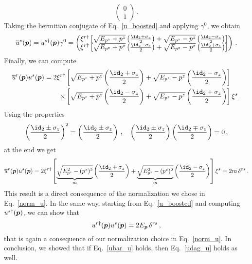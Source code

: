 \begin{sol}
\begin{equation}
\begin{pmatrix}
            0 \\ 1
        \end{pmatrix}\,.
    \end{equation}
    Taking the hermitian conjugate of Eq.~\eqref{u_boosted} and applying $\gamma^0$, we obtain
    \begin{equation}
    \label{ubar_boosted}
        \sbar{u}^{s}(\vp) = u^{s\dagger}(\vp) \gamma^0 =
        \begin{pmatrix}
           \xi^{r\dagger} \left[\sqrt{E_{p^z} + p^z}\left( \frac{\id_2 + \sigma_z}{2} \right) + \sqrt{E_{p^z} - p^z}\left( \frac{\id_2 - \sigma_z}{2} \right) \right]  \\
            \xi^{r\dagger}\left[\sqrt{E_{p^z} + p^z}\left( \frac{\id_2 - \sigma_z}{2} \right) + \sqrt{E_{p^z} - p^z}\left( \frac{\id_2 + \sigma_z}{2} \right) \right]
        \end{pmatrix}\,.
    \end{equation}
   Finally, we can compute
    \begin{equation}
    \begin{split}
        \sbar{u}^r(\vp) u^s(\vp) = 2 \xi^{r\dagger}&\left[  \sqrt{E_{p^z} + p^z}\left( \frac{\id_2 + \sigma_z}{2} \right)+ \sqrt{E_{p^z} - p^z}\left( \frac{\id_2 - \sigma_z}{2} \right)\right] \\
        \times &\left[ \sqrt{E_{p^z} + p^z}\left( \frac{\id_2 - \sigma_z}{2} \right) + \sqrt{E_{p^z} - p^z}\left( \frac{\id_2 + \sigma_z}{2} \right)\right] \xi^s\,.
    \end{split}
    \end{equation}
    Using the properties
    \begin{equation}
        \left( \frac{\id_2 \pm \sigma_z}{2}\right)^2 = \left( \frac{\id_2 \pm \sigma_z}{2}\right)\,, \quad \left( \frac{\id_2 \pm \sigma_z}{2}\right)\left( \frac{\id_2 \mp \sigma_z}{2}\right) = 0\,,
    \end{equation}
    at the end we get
    \begin{equation}
    \label{ubar_u}
        \sbar{u}^r(\vp) u^s(\vp) = 2 \xi^{r\dagger} \left[ \underbrace{\sqrt{E_{p^z}^2 - (p^{z})^2}}_{m} \left(\frac{\id_2 + \sigma_z}{2}\right) + \underbrace{\sqrt{E_{p^z}^2 - (p^{z})^2}}_{m} \left(\frac{\id_2 - \sigma_z}{2}\right) \right] \xi^s = 2 m \, \delta^{rs}\,.
    \end{equation}
    This result is a direct consequence of the normalization we chose in Eq.~\eqref{norm_u}.
    In the same way, starting from Eq.~\eqref{u_boosted} and computing $u^{s\dagger}(\boldsymbol{p})$, we can show that
    \begin{equation}
    \label{udag_u}
        u^{r\dagger}(\boldsymbol{p}) u^s(\boldsymbol{p}) = 2 E_{\boldsymbol{p}} \, \delta^{rs} \,,
    \end{equation}
    that is again a consequence of our normalization choice in Eq.~\eqref{norm_u}. In conclusion, we showed that if Eq.~\eqref{ubar_u} holds, then Eq.~\eqref{udag_u} holds as well.
\end{sol}